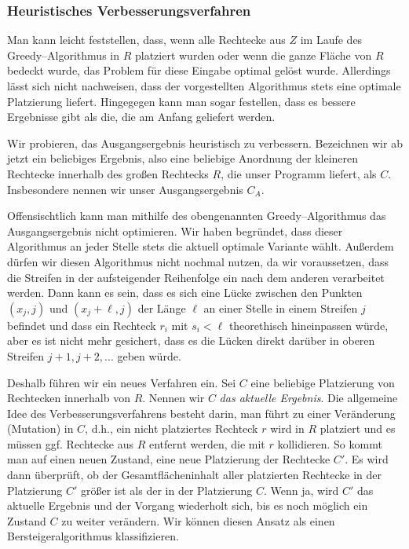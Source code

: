 \subsubsection{Heuristisches Verbesserungsverfahren}
Man kann leicht feststellen, dass, wenn alle Rechtecke aus $Z$ im Laufe des
Greedy--Algorithmus in $R$ platziert wurden oder wenn die ganze Fläche von $R$ bedeckt wurde, 
das Problem für diese Eingabe optimal gelöst wurde.
Allerdings lässt sich nicht nachweisen, dass der vorgestellten Algorithmus 
stets eine optimale Platzierung liefert.
Hingegegen kann man sogar festellen, dass es bessere Ergebnisse gibt als die,
die am Anfang geliefert werden. 


Wir probieren, das Ausgangsergebnis heuristisch zu verbessern.
Bezeichnen wir ab jetzt ein beliebiges Ergebnis, also eine beliebige Anordnung
der kleineren Rechtecke innerhalb des großen Rechtecks $R$, die unser Programm liefert, 
als $C$. Insbesondere nennen wir unser Ausgangsergebnis $C_A$.


Offensischtlich kann man mithilfe des obengenannten Greedy--Algorithmus 
das Ausgangsergebnis nicht optimieren. Wir haben begründet, dass dieser Algorithmus
an jeder Stelle stets die aktuell optimale Variante wählt. 
Außerdem dürfen wir diesen Algorithmus nicht nochmal nutzen,
da wir voraussetzen, dass die Streifen in der aufsteigender Reihenfolge ein nach dem anderen
verarbeitet werden. Dann kann es sein, dass es sich eine Lücke zwischen den Punkten $(x_j, j)$ und 
$(x_j + \ell, j)$ der Länge $\ell$ an einer Stelle in einem Streifen $j$ befindet
und dass ein Rechteck $r_i$ mit $s_i < \ell$ theorethisch hineinpassen würde, aber
es ist nicht mehr gesichert, dass es die Lücken direkt darüber in oberen Streifen $j+1, j+2, ...$
geben würde.


Deshalb führen wir ein neues Verfahren ein. 
Sei $C$ eine beliebige Platzierung von Rechtecken innerhalb von $R$.
Nennen wir $C$ \textit{das aktuelle Ergebnis}. 
Die allgemeine Idee des Verbesserungsverfahrens besteht darin,
man führt zu einer Veränderung (Mutation) in $C$, d.h., 
ein nicht platziertes Rechteck $r$ wird in $R$ platziert und es müssen ggf. 
Rechtecke aus $R$ entfernt werden, die mit $r$ kollidieren.
So kommt man auf einen neuen Zustand, eine neue Platzierung der Rechtecke $C'$.
Es wird dann überprüft, ob der Gesamtflächeninhalt aller platzierten Rechtecke in der Platzierung $C'$
größer ist als der in der Platzierung $C$.
Wenn ja, wird $C'$ das aktuelle Ergebnis und der Vorgang wiederholt sich,
bis es noch möglich ein Zustand $C$ zu weiter verändern.
Wir können diesen Ansatz als einen Bersteigeralgorithmus klassifizieren.


